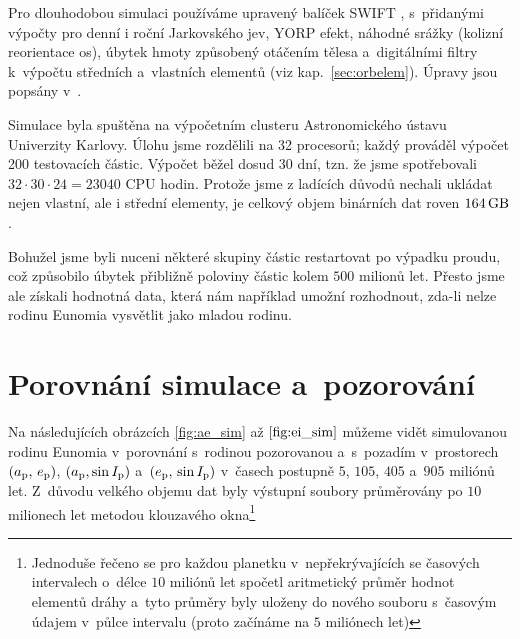 \documentclass[A4paper, 12pt, oneside]{book}
\begin{document}
Pro dlouhodobou simulaci používáme upravený balíček SWIFT \cite{levison94}, s~přidanými výpočty pro denní i roční Jarkovského jev, YORP efekt, náhodné srážky (kolizní reorientace os), úbytek hmoty způsobený otáčením tělesa a~digitálními filtry k~výpočtu středních a~vlastních elementů (viz kap.~\ref{sec:orbelem}). Úpravy jsou popsány v~\cite{broz11}.

Simulace byla spuštěna na výpočetním clusteru Astronomického ústavu Univerzity Karlovy. Úlohu jsme rozdělili na 32 procesorů; každý prováděl výpočet 200 testovacích částic. Výpočet běžel dosud 30 dní, tzn. že jsme spotřebovali $32\cdot30\cdot24=23040$ CPU hodin. Protože jsme z ladících důvodů nechali ukládat nejen vlastní, ale i střední elementy, je celkový objem binárních dat roven $164\,{\rm GB}$.

Bohužel jsme byli nuceni některé skupiny částic restartovat po výpadku proudu, což způsobilo úbytek přibližně poloviny částic kolem $500$ milionů let. Přesto jsme ale získali hodnotná data, která nám například umožní rozhodnout, zda-li nelze rodinu Eunomia vysvětlit jako mladou rodinu.

\section{Porovnání simulace a~pozorování}

Na následujících obrázcích \ref{fig:ae_sim} až $\ref{fig:ei_sim}$ můžeme vidět simulovanou rodinu Eunomia v~porovnání s~rodinou pozorovanou a~s~pozadím v~prostorech $(a_{\rm p},\,e_{\rm p})$, $(a_{\rm p}, \sin I_{\rm p})$ a~$(e_{\rm p},\,\sin I_{\rm p})$ v~časech postupně $5$, $105$, $405$ a~$905$ miliónů let. Z~důvodu velkého objemu dat byly výstupní soubory průměrovány po $10$ milionech let metodou klouzavého okna\footnote{Jednoduše řečeno se pro každou planetku v~nepřekrývajících se časových intervalech o~délce $10$ miliónů let spočetl aritmetický průměr hodnot elementů dráhy a~tyto průměry byly uloženy do nového souboru s~časovým údajem v~půlce intervalu (proto začínáme na $5$ miliónech let)}
\end{document}
